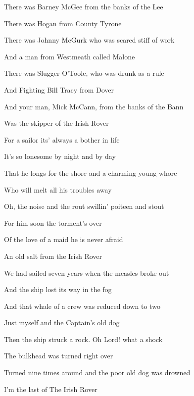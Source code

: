 \bigskip

There was Barney McGee from the banks of the Lee

There was Hogan from County Tyrone

There was Johnny McGurk who was scared stiff of work

And a man from Westmeath called Malone

There was Slugger O'Toole, who was drunk as a rule

And Fighting Bill Tracy from Dover

And your man, Mick McCann, from the banks of the Bann

Was the skipper of the Irish Rover

\bigskip

\bigskip

For a sailor its' always a bother in life

It's so lonesome by night and by day

That he longs for the shore and a charming young whore

Who will melt all his troubles away

Oh, the noise and the rout swillin' poiteen and stout

For him soon the torment's over

Of the love of a maid he is never afraid

An old salt from the Irish Rover

\bigskip

\bigskip

We had sailed seven years when the measles broke out

And the ship lost its way in the fog

And that whale of a crew was reduced down to two

Just myself and the Captain's old dog

Then the ship struck a rock. Oh Lord! what a shock

The bulkhead was turned right over

Turned nine times around and the poor old dog was drowned

I'm the last of The Irish Rover
